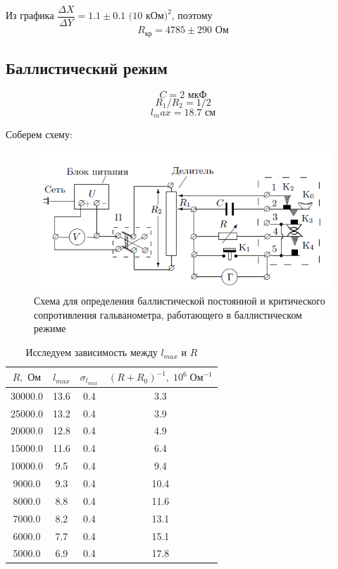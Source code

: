 \documentclass[a4paper, 12pt]{article}
\begin{document}
Из графика $\dfrac{\Delta X}{\Delta Y} = 1.1 \pm 0.1 \text{ (10 кОм)}^2$, поэтому 
$$R_\text{кр} = 4785 \pm 290 \text{ Ом}$$

\subsection*{Баллистический режим}

$$C = 2 \text{ мкФ}$$
$$R_1/R_2 = 1/2$$
$$l_max = 18.7 \text{ см}$$

Соберем схему:

\begin {figure}[H]
	\begin{center}
		\includegraphics[width = 0.8 \textwidth]{Scheme2}
		\caption{Схема для определения баллистической постоянной и критического сопротивления гальванометра, работающего в баллистическом режиме}
	\end{center}
\end {figure}

\begin{table}[H]
\centering
\begin{tabular}{|c|c|c|c|}
\hline
$R, \text{ Ом}$ & $l_{max}$ & $\sigma_{l_{max}}$ & $(R+R_0)^{-1}, \; 10^6 \; \text{Ом}^{-1}$ \\ \hline
30000.0         & 13.6      & 0.4                & 3.3            \\ \hline
25000.0         & 13.2      & 0.4                & 3.9            \\ \hline
20000.0         & 12.8      & 0.4                & 4.9            \\ \hline
15000.0         & 11.6      & 0.4                & 6.4            \\ \hline
10000.0         & 9.5       & 0.4                & 9.4            \\ \hline
9000.0          & 9.3       & 0.4                & 10.4           \\ \hline
8000.0          & 8.8       & 0.4                & 11.6           \\ \hline
7000.0          & 8.2       & 0.4                & 13.1           \\ \hline
6000.0          & 7.7       & 0.4                & 15.1           \\ \hline
5000.0          & 6.9       & 0.4                & 17.8           \\ \hline
\end{tabular}
\caption{Исследуем зависимость между $l_{max}$ и $R$}
\end{table}
\end{document}
